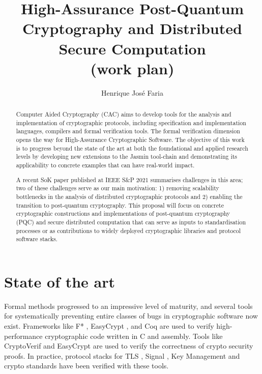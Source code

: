 \documentclass[preprint]{iacrtrans}
\author{}
\institute{}
\title[\texttt{High-Assurance Post-Quantum Cryptography and Distributed Secure Computation}]
{High-Assurance Post-Quantum Cryptography and Distributed Secure Computation \\ (work plan)}
\author{Henrique José Faria}
\begin{document}
\maketitle


\begin{abstract}
  Computer Aided Cryptography (CAC) aims to develop tools for the
  analysis and implementation of cryptographic protocols, including
  specification and implementation languages, compilers and formal
  verification tools. The formal verification dimension opens the way
  for High-Assurance Cryptographic Software. The objective of this
  work is to progress beyond the state of the art at both the
  foundational and applied research levels by developing new
  extensions to the Jasmin tool-chain and demonstrating its
  applicability to concrete examples that can have real-world impact.

  A recent SoK paper \cite{SoK} published at IEEE S\&P 2021
  summarises challenges in this area; two of these challenges serve as
  our main motivation: 1) removing scalability bottlenecks in the
  analysis of distributed cryptographic protocols and 2) enabling the
  transition to post-quantum cryptography. This proposal will focus on
  concrete cryptographic constructions and implementations of
  post-quantum cryptography (PQC) and secure distributed computation
  that can serve as inputs to standardisation processes or as
  contributions to widely deployed cryptographic libraries and
  protocol software stacks.
\end{abstract}

\section*{State of the art}

  Formal methods progressed to an impressive level of maturity, and
  several tools for systematically preventing entire classes of bugs in
  cryptographic software now exist. Frameworks like F* \cite{FSTR}, EasyCrypt
  \cite{EC}, and Coq \cite{FIAT} are used to verify high-performance cryptographic
  code written in C and assembly. Tools like CryptoVerif \cite{CVRF} and
  EasyCrypt are used to verify the correctness of crypto security
  proofs. In practice, protocol stacks for TLS \cite{TLS}, Signal \cite{SIGN}, Key
  Management \cite{KMS} and crypto standards \cite{SHA3,HACL} have been verified
  with these tools.
\end{document}
